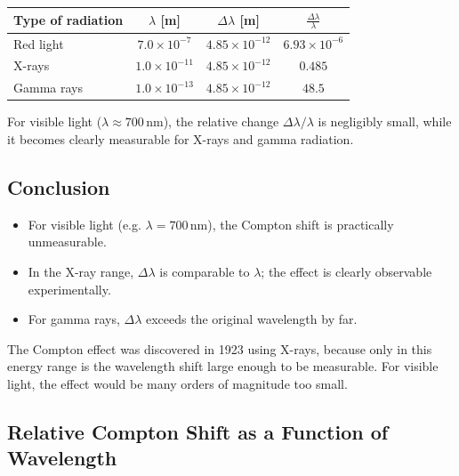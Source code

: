 \begin{center}
	\begin{tabular}{|l|c|c|c|}
		\hline
		\textbf{Type of radiation} & \(\lambda\) [m] & \(\Delta \lambda\) [m] & \(\frac{\Delta \lambda}{\lambda}\) \\
		\hline
		Red light & \(7.0 \times 10^{-7}\) & \(4.85 \times 10^{-12}\) & \(6.93 \times 10^{-6}\) \\
		X-rays & \(1.0 \times 10^{-11}\) & \(4.85 \times 10^{-12}\) & \(0.485\) \\
		Gamma rays & \(1.0 \times 10^{-13}\) & \(4.85 \times 10^{-12}\) & \(48.5\) \\
		\hline
	\end{tabular}
\end{center}

\begin{NoteBox}
	For visible light (\(\lambda \approx 700\,\text{nm}\)), 
	the relative change \(\Delta \lambda / \lambda\) is negligibly small,
	while it becomes clearly measurable for X-rays and gamma radiation.
\end{NoteBox}


\subsection*{Conclusion}

\begin{itemize}
	\item For visible light (e.g. \( \lambda = 700\,\text{nm} \)), the Compton shift is practically unmeasurable.
	\item In the X-ray range, \(\Delta \lambda\) is comparable to \(\lambda\); the effect is clearly observable experimentally.
	\item For gamma rays, \(\Delta \lambda\) exceeds the original wavelength by far.
\end{itemize}

\begin{PhysicsBox}
	The Compton effect was discovered in 1923 using X-rays,
	because only in this energy range is the wavelength shift large enough to be measurable.
	For visible light, the effect would be many orders of magnitude too small.
\end{PhysicsBox}

\newpage
\noindent

\subsection*{Relative Compton Shift as a Function of Wavelength}

